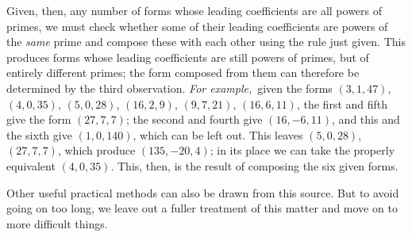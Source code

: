 Given, then, any number of forms whose leading coefficients are all powers of primes, we must check whether some of their leading coefficients are powers of the \textit{same} prime and compose these with each other using the rule just given. This produces forms whose leading coefficients are still powers of primes, but of entirely different primes; the form composed from them can therefore be determined by the third observation. \textit{For example,}\ given the forms $(3,1,47)$, $(4,0,35)$, $(5,0,28)$, $(16,2,9)$, $(9,7,21)$, $(16,6,11)$, the first and fifth give the form $(27,7,7)$; the second and fourth give $(16,-6,11)$, and this and the sixth give $(1,0,140)$, which can be left out. This leaves $(5,0,28)$, $(27,7,7)$, which produce $(135,-20,4)$; in its place we can take the properly equivalent $(4,0,35)$. This, then, is the result of composing the six given forms.

Other useful practical methods can also be drawn from this source. But to avoid going on too long, we leave out a fuller treatment of this matter and move on to more difficult things.
